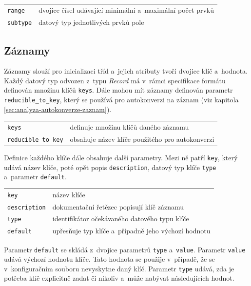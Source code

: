 \documentclass[FM,bw,DP]{tulthesis}
\begin{document}
\vspace{0.5cm}
\begin{tabular}{m{3cm}@{}l}
\texttt{range}\dotfill & dvojice čísel udávající minimální a~maximální počet prvků \\
\texttt{subtype}\dotfill & datový typ jednotlivých prvků pole \\
\end{tabular}

\subsection{Záznamy}

Záznamy slouží pro inicializaci tříd a~jejich atributy tvoří dvojice klíč a~hodnota. Každý datový typ odvozen z~typu \textit{Record} má v~rámci specifikace formátu definován množinu klíčů \texttt{keys}. Dále mohou mít záznamy definován parametr \texttt{reducible\_to\_key}, který se používá pro autokonverzi na záznam (viz kapitola \ref{sec:analyza-autokonverze-zaznam}).

\vspace{0.5cm}
\begin{tabular}{m{4cm}@{}l}
\texttt{keys}\dotfill & definuje množinu klíčů daného záznamu \\
\texttt{reducible\_to\_key}\dotfill & obsahuje název klíče použitého pro autokonverzi \\
\end{tabular}
\vspace{0.5cm}

Definice každého klíče dále obsahuje další parametry. Mezi ně patří \texttt{key}, který udává název klíče, poté opět popis \texttt{description}, datový typ klíče \texttt{type} a~parametr \texttt{default}.

\vspace{0.5cm}
\begin{tabular}{m{4cm}@{}l}
\texttt{key}\dotfill & název klíče \\
\texttt{description}\dotfill & dokumentační řetězec popisují klíč záznamu \\
\texttt{type}\dotfill & identifikátor očekávaného datového typu klíče \\
\texttt{default}\dotfill & upřesňuje typ klíče a~případně jeho výchozí hodnotu \\
\end{tabular}
\vspace{0.5cm}

Parametr \texttt{default} se skládá z~dvojice parametrů \texttt{type} a~\texttt{value}. Parametr \texttt{value} udává výchozí hodnotu klíče. Tato hodnota se použije v~případě, že se v~konfiguračním souboru nevyskytne daný klíč. Parametr \texttt{type} udává, zda je potřeba klíč explicitně zadat či nikoliv a~může nabývat následujících hodnot.
\end{document}
